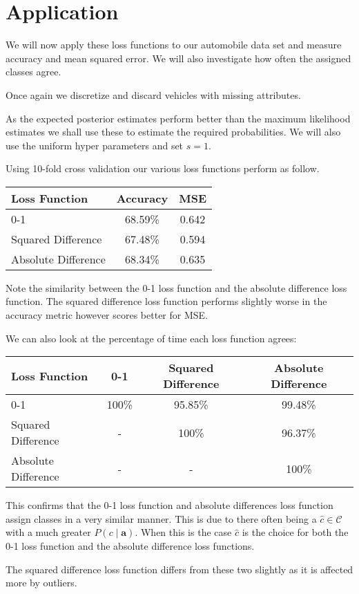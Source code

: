 \section{Application}
We will now apply these loss functions to our automobile data set and measure accuracy and mean squared error.
We will also investigate how often the assigned classes agree.

Once again we discretize and discard vehicles with missing attributes.

As the expected posterior estimates perform better than the maximum likelihood estimates we shall use these to estimate the required probabilities.
We will also use the uniform hyper parameters and set $s=1$.

Using 10-fold cross validation our various loss functions perform as follow.

\begin{center}
\begin{tabular}{l|c c}
	Loss Function       & Accuracy & MSE   \\
	\hline
	0-1                 & 68.59\%  & 0.642 \\
	Squared Difference  & 67.48\%  & 0.594 \\
	Absolute Difference & 68.34\%  & 0.635 \\
\end{tabular}
\end{center}

Note the similarity between the 0-1 loss function and the absolute difference loss function.
The squared difference loss function performs slightly worse in the accuracy metric however scores better for MSE.

We can also look at the percentage of time each loss function agrees:
\begin{center}
\begin{tabular}{l|c c c}
	Loss Function       & 0-1     & Squared Difference & Absolute Difference   \\
	\hline
	0-1                 & 100\% & 95.85\% & 99.48\% \\
	Squared Difference  & - & 100\% & 96.37\%\\
	Absolute Difference & - & - & 100\% \\
\end{tabular}
\end{center}

This confirms that the 0-1 loss function and absolute differences loss function assign classes in a very similar manner.
This is due to there often being a $\hat{c} \in \mathcal{C}$ with a much greater $P(c \mid \mathbf{a})$.
When this is the case $\hat{c}$ is the choice for both the 0-1 loss function and the absolute difference loss functions.

The squared difference loss function differs from these two slightly as it is affected more by outliers.